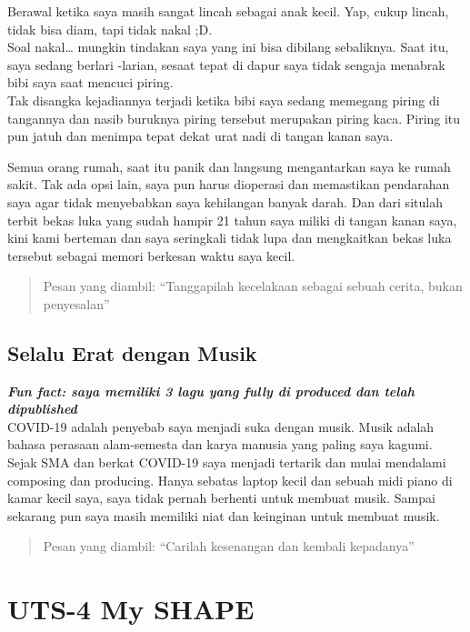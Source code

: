 \documentclass[
  letterpaper,
  DIV=11,
  numbers=noendperiod]{scrreprt}
\begin{document}
Berawal ketika saya masih sangat lincah sebagai anak kecil. Yap, cukup
lincah, tidak bisa diam, tapi tidak nakal ;D.\\
Soal nakal\ldots{} mungkin tindakan saya yang ini bisa dibilang
sebaliknya. Saat itu, saya sedang berlari -larian, sesaat tepat di dapur
saya tidak sengaja menabrak bibi saya saat mencuci piring.\\
Tak disangka kejadiannya terjadi ketika bibi saya sedang memegang piring
di tangannya dan nasib buruknya piring tersebut merupakan piring kaca.
Piring itu pun jatuh dan menimpa tepat dekat urat nadi di tangan kanan
saya.

Semua orang rumah, saat itu panik dan langsung mengantarkan saya ke
rumah sakit. Tak ada opsi lain, saya pun harus dioperasi dan memastikan
pendarahan saya agar tidak menyebabkan saya kehilangan banyak darah. Dan
dari situlah terbit bekas luka yang sudah hampir 21 tahun saya miliki di
tangan kanan saya, kini kami berteman dan saya seringkali tidak lupa dan
mengkaitkan bekas luka tersebut sebagai memori berkesan waktu saya
kecil.

\begin{quote}
Pesan yang diambil: ``Tanggapilah kecelakaan sebagai sebuah cerita,
bukan penyesalan''
\end{quote}

\section{Selalu Erat dengan Musik}\label{selalu-erat-dengan-musik}

\textbf{\emph{Fun fact: saya memiliki 3 lagu yang fully di produced dan
telah dipublished}}\\
COVID-19 adalah penyebab saya menjadi suka dengan musik. Musik adalah
bahasa perasaan alam-semesta dan karya manusia yang paling saya kagumi.
Sejak SMA dan berkat COVID-19 saya menjadi tertarik dan mulai mendalami
composing dan producing. Hanya sebatas laptop kecil dan sebuah midi
piano di kamar kecil saya, saya tidak pernah berhenti untuk membuat
musik. Sampai sekarang pun saya masih memiliki niat dan keinginan untuk
membuat musik.

\begin{quote}
Pesan yang diambil: ``Carilah kesenangan dan kembali kepadanya''
\end{quote}


\chapter{UTS-4 My SHAPE}\label{uts-4-my-shape}
\end{document}
